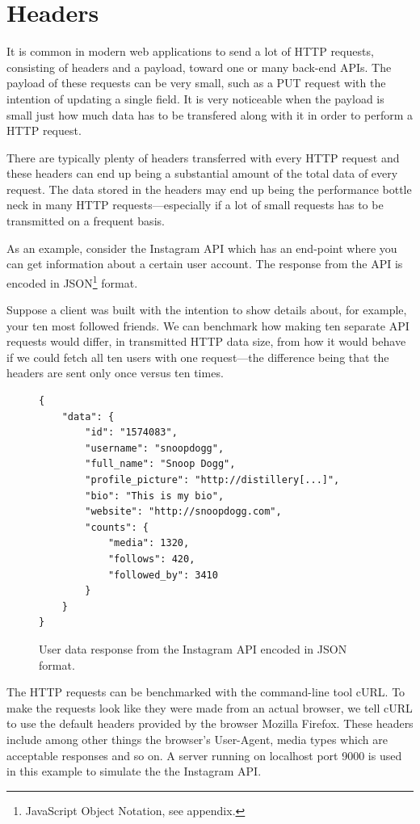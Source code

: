 \documentclass{cslthse-msc}
\begin{document}
\section{Headers}
\label{headers}

It is common in modern web applications to send a lot of HTTP requests, consisting of headers and a payload, toward one or many back-end APIs. The payload of these requests can be very small, such as a PUT request with the intention of updating a single field. It is very noticeable when the payload is small just how much data has to be transfered along with it in order to perform a HTTP request.

There are typically plenty of headers transferred with every HTTP request and these headers can end up being a substantial amount of the total data of every request. The data stored in the headers may end up being the performance bottle neck in many HTTP requests\cite{rfc6202}---especially if a lot of small requests has to be transmitted on a frequent basis.

As an example, consider the Instagram API\cite{instagram_api} which has an end-point where you can get information about a certain user account. The response from the API is encoded in JSON\footnote{JavaScript Object Notation, see appendix.} format. 

Suppose a client was built with the intention to show details about, for example, your ten most followed friends. We can benchmark how making ten separate API requests would differ, in transmitted HTTP data size, from how it would behave if we could fetch all ten users with one request---the difference being that the headers are sent only once versus ten times.

\begin{figure}[H]
  \centering
    \begin{lstlisting}
{
    "data": {
        "id": "1574083",
        "username": "snoopdogg",
        "full_name": "Snoop Dogg",
        "profile_picture": "http://distillery[...]",
        "bio": "This is my bio",
        "website": "http://snoopdogg.com",
        "counts": {
            "media": 1320,
            "follows": 420,
            "followed_by": 3410
        }
    }
}
    \end{lstlisting}
  \caption{User data response from the Instagram API encoded in JSON format.}
\end{figure}

The HTTP requests can be benchmarked with the command-line tool cURL\cite{curl}. To make the requests look like they were made from an actual browser, we tell cURL to use the default headers provided by the browser Mozilla Firefox. These headers include among other things the browser's User-Agent, media types which are acceptable responses and so on. A server running on localhost port 9000 is used in this example to simulate the the Instagram API.
\end{document}
